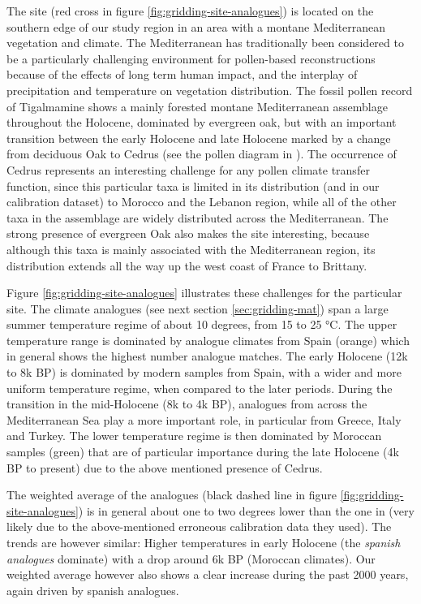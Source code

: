 \begin{refsection}
The site (red cross in figure \ref{fig:gridding-site-analogues}) is located on the southern edge of our study region in an area with a montane Mediterranean vegetation and climate. The Mediterranean has traditionally been considered to be a particularly challenging environment for pollen-based reconstructions because of the effects of long term human impact, and the interplay of precipitation and temperature on vegetation distribution. The fossil pollen record of Tigalmamine shows a mainly forested montane Mediterranean assemblage throughout the Holocene, dominated by evergreen oak, but with an important transition between the early Holocene and late Holocene marked by a change from deciduous Oak to Cedrus (see the pollen diagram in \cite{CheddadiLambGuiotEtAl1998}). The occurrence of Cedrus represents an interesting challenge for any pollen climate transfer function, since this particular taxa is limited in its distribution (and in our calibration dataset) to Morocco and the Lebanon region, while all of the other taxa in the assemblage are widely distributed across the Mediterranean. The strong presence of evergreen Oak also makes the site interesting, because although this taxa is mainly associated with the Mediterranean region, its distribution extends all the way up the west coast of France to Brittany.

Figure \ref{fig:gridding-site-analogues} illustrates these challenges for the particular site. The climate analogues (see next section \ref{sec:gridding-mat}) span a large summer temperature regime of about 10 degrees, from 15 to 25 °C. The upper temperature range is dominated by analogue climates from Spain (orange) which in general shows the highest number analogue matches. The early Holocene (12k to 8k BP) is dominated by modern samples from Spain, with a wider and more uniform temperature regime, when compared to the later periods. During the transition in the mid-Holocene (8k to 4k BP), analogues from across the Mediterranean Sea play a more important role, in particular from Greece, Italy and Turkey. The lower temperature regime is then dominated by Moroccan samples (green) that are of particular importance during the late Holocene (4k BP to present) due to the above mentioned presence of Cedrus. 

The weighted average of the analogues (black dashed line in figure \ref{fig:gridding-site-analogues}) is in general about one to two degrees lower than the one in \cite{CheddadiLambGuiotEtAl1998} (very likely due to the above-mentioned erroneous calibration data they used). The trends are however similar: Higher temperatures in early Holocene  (the \textit{spanish analogues} dominate) with a drop around 6k BP (Moroccan climates). Our weighted average however also shows a clear increase during the past 2000 years, again driven by spanish analogues.


\end{refsection}
